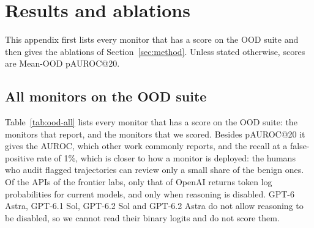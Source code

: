 \section{Results and ablations}
\label{app:ood-results}

This appendix first lists every monitor that has a score on the OOD suite and then gives the ablations of Section~\ref{sec:method}.
Unless stated otherwise, scores are Mean-OOD pAUROC@20.

\subsection{All monitors on the OOD suite}
\label{app:ood-all}

Table~\ref{tab:ood-all} lists every monitor that has a score on the OOD suite: the monitors that \citet{sinha2026training} report, and the monitors that we scored.
Besides pAUROC@20 it gives the AUROC, which other work commonly reports, and the recall at a false-positive rate of 1\%, which is closer to how a monitor is deployed: the humans who audit flagged trajectories can review only a small share of the benign ones.
Of the APIs of the frontier labs, only that of OpenAI returns token log probabilities for current models, and only when reasoning is disabled.
GPT-6 Astra, GPT-6.1 Sol, GPT-6.2 Sol and GPT-6.2 Astra do not allow reasoning to be disabled, so we cannot read their binary logits and do not score them.

